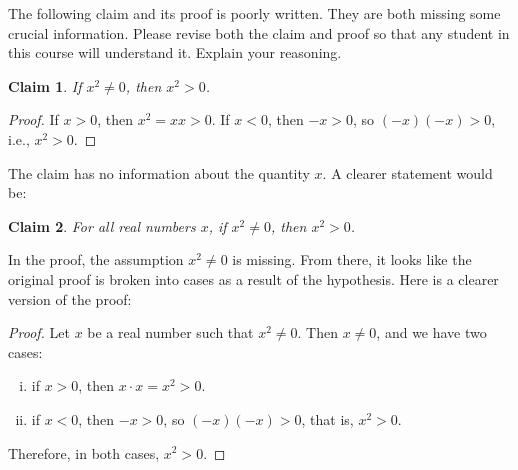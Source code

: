 \documentclass{article}
\newtheorem*{claim}{Claim}
\theoremstyle{definition}
\begin{document}
\begin{question}
   The following claim and its proof is poorly written. They are both missing some crucial information. 
   Please revise both the claim and proof so that any student in this course will understand it. Explain your reasoning.
      \begin{claim}
       If $x^2\neq 0$, then $x^2>0$.
      \end{claim}
      \begin{proof}
       If $x>0$, then $x^2=xx>0$. If $x<0$, then $-x>0$, so $(-x)(-x)>0$, i.e., $x^2>0$.
      \end{proof}
\end{question}
\begin{solution}
    The claim has no information about the quantity $x$. A clearer statement would be:
        \begin{claim}
           For all real numbers $x$, if $x^2\neq 0$, then $x^2>0$.
        \end{claim}
    In the proof, the assumption $x^2\neq 0$ is missing. 
    From there, it looks like the original proof is broken into cases as a result of the hypothesis. 
    Here is a clearer version of the proof:
        \begin{proof}
           Let $x$ be a real number such that $x^2\neq 0$. Then $x\neq 0$, and we have two cases:
            \begin{enumerate}[i.]
                 \item if $x>0$, then $x\cdot x=x^2>0$.
                 \item if $x<0$, then $-x>0$, so $(-x)(-x)>0$, that is, $x^2>0$.
            \end{enumerate}
           Therefore, in both cases, $x^2>0$.
        \end{proof}
\end{solution}
\end{document}
